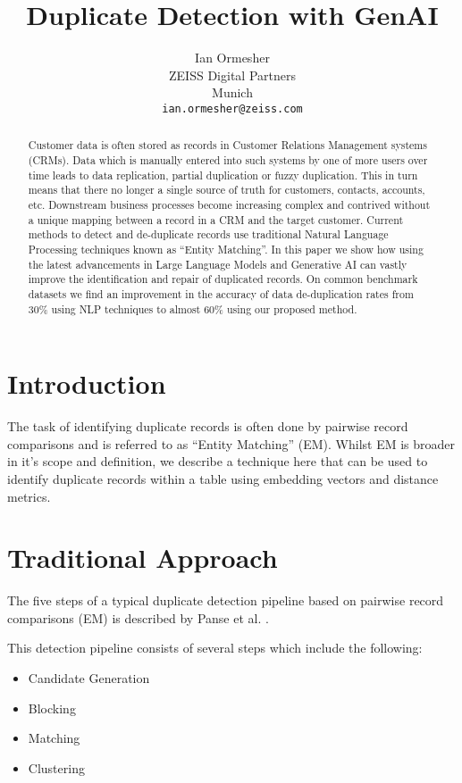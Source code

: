 \documentclass{article}
\title{Duplicate Detection with GenAI}
\author{
  Ian Ormesher \\
  ZEISS Digital Partners \\
  Munich \\
  \texttt{ian.ormesher@zeiss.com} \\
}
\begin{document}
\maketitle

\begin{abstract}

Customer data is often stored as records in Customer Relations Management systems (CRMs). Data which is manually entered into such systems by one of more users over time leads to data replication, partial duplication or fuzzy duplication. This in turn means that there no longer a single source of truth for customers, contacts, accounts, etc. Downstream business processes become increasing complex and contrived without a unique mapping between a record in a CRM and the target customer. Current methods to detect and de-duplicate records use traditional Natural Language Processing techniques known as “Entity Matching”. In this paper we show how using the latest advancements in Large Language Models and Generative AI can vastly improve the identification and repair of duplicated records. On common benchmark datasets we find an improvement in the accuracy of data de-duplication  rates from 30\% using NLP techniques to almost 60\% using our proposed method.
\end{abstract}


\section{Introduction}
The task of identifying duplicate records is often done by pairwise record comparisons and is referred to as “Entity Matching” (EM). Whilst EM is broader in it’s scope and definition, we describe a technique here that can be used to identify duplicate records within a table using embedding vectors and distance metrics.

\section{Traditional Approach}
\label{sec:headings}

The five steps of a typical duplicate detection pipeline based on pairwise record comparisons (EM) is described by Panse et al. \cite{dupdeteval}.

This detection pipeline consists of several steps which include the following:
\begin{itemize}
\item Candidate Generation
\item Blocking
\item Matching
\item Clustering
\end{itemize}
\end{document}
